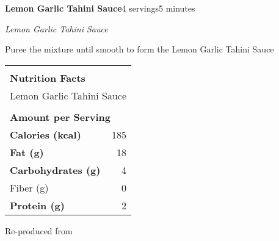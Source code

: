 \documentclass[../recipe-collections/cooking.tex]{subfiles}
\begin{document}
\begin{recipe}{\textbf{Lemon Garlic Tahini Sauce}}{4 servings}{5 minutes}

  \freeform{}\textit{Lemon Garlic Tahini Sauce}


  Puree the mixture until smooth to form the Lemon Garlic Tahini Sauce

  \bigskip
  \centering
  \begin{tabular}{|lr|}
    \hline
                                        &                                       \\
    \multicolumn{2}{|l|}{\huge{\textbf{\textrm{Nutrition Facts}}}}              \\
    \multicolumn{2}{|l|}{\textrm{Lemon Garlic Tahini Sauce}}                               \\ 
                                        &                                       \\
    \multicolumn{2}{|l|}{\footnotesize{\textbf{\textrm{Amount per Serving}}}}   \\ \hline
    \textbf{\textrm{Calories (kcal)}}   & \textrm{185}                          \\ \hline
    \textbf{\textrm{Fat (g)}}           & \textrm{18}                           \\ \hline
    \textbf{\textrm{Carbohydrates (g)}} & \textrm{4}                            \\ \hline
    \hspace{2mm} \textrm{Fiber (g)}     & \textrm{0}                            \\ \hline
    \textbf{\textrm{Protein (g)}}       & \textrm{2}                            \\ \hline
  \end{tabular}

  \freeform{}\hrulefill{}

\end{recipe}

Re-produced from  \autocite{wholesomeyum_2019}
\end{document}
